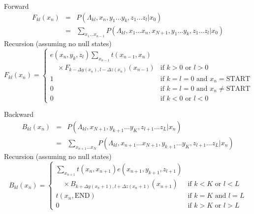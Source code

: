 \documentclass{beamer}
\begin{document}
\begin{frame}{}

\small
Forward
\begin{eqnarray*}
F_{kl}(x_n)
& = & P \left( \Lambda_{kl},x_n,y_1 \ldots y_k,z_1 \ldots z_l | x_0 \right) \\
& = & \sum_{x_1 \ldots x_{n-1}}
P \left( \Lambda_{kl},x_1 \ldots x_n,x_{N+1},y_1 \ldots y_k,z_1 \ldots z_l | x_0 \right)
\end{eqnarray*}
Recursion (assuming no null states)
\[
F_{kl}(x_n) = \left\{ \begin{array}{ll} \displaystyle
e(x_n,y_k,z_l) \sum_{x_{n-1}} t(x_{n-1},x_n) & \\ \quad \times
F_{k-\Delta y(x_n),l-\Delta z(x_n)}(x_{n-1}) & \mbox{if $k > 0$ or $l > 0$} \\
1 & \mbox{if $k=l=0$ and $x_n=$START} \\
0 & \mbox{if $k=l=0$ and $x_n\neq$START} \\
0 & \mbox{if $k < 0$ or $l < 0$}
\end{array} \right.
\]

\end{frame}

\begin{frame}{}

\small
Backward
\begin{eqnarray*}
B_{kl}(x_n)
& = & P \left( \Lambda_{kl},x_{N+1},y_{k+1} \ldots y_K,z_{l+1} \ldots z_L | x_n \right) \\
& = & \sum_{x_{n+1} \ldots x_N}
P \left( \Lambda_{kl},x_{n+1} \ldots x_{N+1},y_{k+1} \ldots y_K,z_{l+1} \ldots z_L | x_n \right)
\end{eqnarray*}
Recursion (assuming no null states)
\[
B_{kl}(x_n) = \left\{ \begin{array}{ll} \displaystyle
\sum_{x_{n+1}}
t(x_n,x_{n+1})
e(x_{n+1},y_{k+1},z_{l+1}) & \\ \quad \times
B_{k+\Delta y(x_n+1),l+\Delta z(x_n+1)}(x_{n+1}) & \mbox{if $k < K$ or $l < L$} \\
t(x_n,\mbox{END}) & \mbox{if $k=K$ and $l=L$} \\
0 & \mbox{if $k > K$ or $l > L$}
\end{array} \right.
\]

\end{frame}
\end{document}
